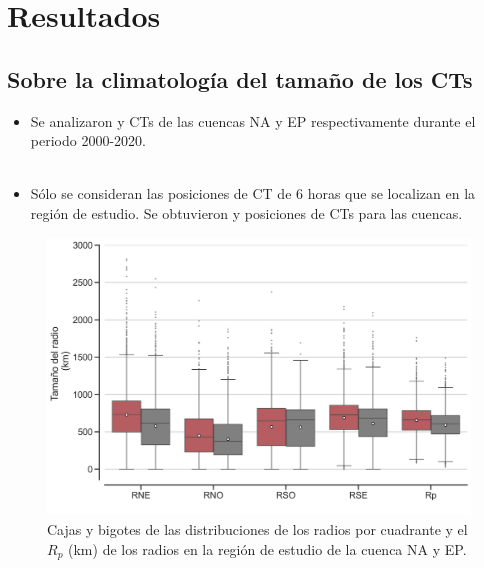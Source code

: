 \section{Resultados}

\subsection{Sobre la climatología del tamaño de los CTs}
\begin{frame}
\begin{itemize}
    \item Se analizaron {} y {} CTs de las cuencas {\red NA} y {\gray EP} respectivamente durante el periodo 2000-2020.
    \\~\
    \item Sólo se consideran las posiciones de CT de 6 horas que se localizan en la región de estudio. Se obtuvieron {} y {} posiciones de CTs para las cuencas.
\end{itemize}
\end{frame}

\begin{frame}
    \begin{figure}
        \centering
        \includegraphics[scale = 0.35]{Images/Figures/Fig_3_1.jpeg}
        \caption{Cajas y bigotes de las distribuciones de los radios por cuadrante y el $R_p$ (km) de los radios en la región de estudio de la cuenca {\red NA} y {\gray EP}.}
        \label{fig:fig_9}
    \end{figure}
\end{frame}

